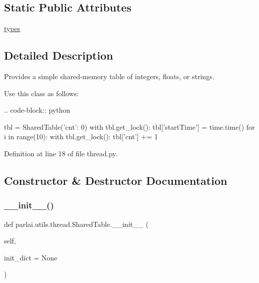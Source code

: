 \subsection*{Static Public Attributes}
\begin{DoxyCompactItemize}
\item 
\hyperlink{classparlai_1_1utils_1_1thread_1_1SharedTable_afd2aec148b1e66d0496f137749862e58}{types}
\end{DoxyCompactItemize}


\subsection{Detailed Description}
\begin{DoxyVerb}Provides a simple shared-memory table of integers, floats, or strings.

Use this class as follows:

.. code-block:: python

    tbl = SharedTable({'cnt': 0})
    with tbl.get_lock():
        tbl['startTime'] = time.time()
    for i in range(10):
        with tbl.get_lock():
            tbl['cnt'] += 1
\end{DoxyVerb}
 

Definition at line 18 of file thread.\+py.



\subsection{Constructor \& Destructor Documentation}
\mbox{\label{classparlai_1_1utils_1_1thread_1_1SharedTable_a52b58b8d6ad0ba31cf2e3236afe970a5}} 
\subsubsection{\texorpdfstring{\+\_\+\+\_\+init\+\_\+\+\_\+()}{\_\_init\_\_()}}
{\footnotesize\ttfamily def parlai.\+utils.\+thread.\+Shared\+Table.\+\_\+\+\_\+init\+\_\+\+\_\+ (\begin{DoxyParamCaption}\item[{}]{self,  }\item[{}]{init\+\_\+dict = {\ttfamily None} }\end{DoxyParamCaption})}


